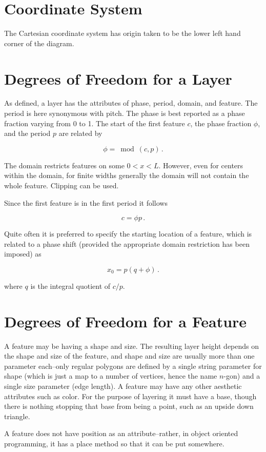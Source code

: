 \documentclass{article}
\begin{document}
\section{Coordinate System}
The Cartesian coordinate system has origin taken to be the lower left hand corner of the diagram.

\section{Degrees of Freedom for a Layer}

As defined, a layer has the attributes of phase, period, domain, and feature. The period is here synonymous with pitch. The phase is best reported as a phase fraction varying from 0 to 1. The start of the first feature $c$, the phase fraction $\phi$, and the period $p$ are related by

$$ \phi = \bmod(c, p) \,.$$

The domain restricts features on some $0 < x < L$. However, even for centers within the domain, for finite widths generally the domain will not contain the whole feature. Clipping can be used.

Since the first feature is in the first period it follows

$$c = \phi p \,. $$

Quite often it is preferred to specify the starting location of a feature, which is related to a phase shift (provided the appropriate domain restriction has been imposed) as

$$ x_0 = p (q + \phi) \,. $$

where $q$ is the integral quotient of $c/p$.

\section{Degrees of Freedom for a Feature}

A feature may be having a shape and size. The resulting layer height depends on the shape and size of the feature, and shape and size are usually more than one parameter each--only regular polygons are defined by a single string parameter for shape (which is just a map to a number of vertices, hence the name $n$-gon) and a single size parameter (edge length). A feature may have any other aesthetic attributes such as color. For the purpose of layering it must have a base, though there is nothing stopping that base from being a point, such as an upside down triangle.

A feature does not have position as an attribute--rather, in object oriented programming, it has a place method so that it can be put somewhere.
\end{document}
